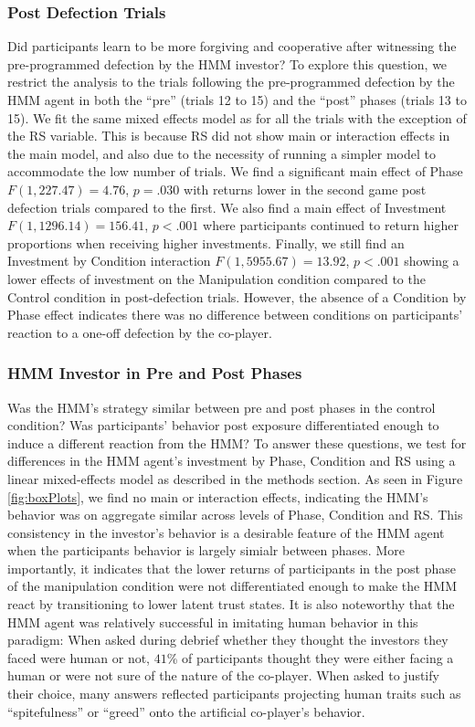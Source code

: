 \documentclass[
]{article}
\begin{document}
\subsubsection{Post Defection Trials}\label{post-defection-trials}

Did participants learn to be more forgiving and cooperative after witnessing the pre-programmed defection by the HMM investor? To explore this question, we restrict the analysis to the trials following the pre-programmed defection by the HMM agent in both the ``pre'' (trials 12 to 15) and the ``post'' phases (trials 13 to 15). We fit the same mixed effects model as for all the trials with the exception of the RS variable. This is because RS did not show main or interaction effects in the main model, and also due to the necessity of running a simpler model to accommodate the low number of trials. We find a significant main effect of Phase \(F(1, 227.47) = 4.76\), \(p = .030\) with returns lower in the second game post defection trials compared to the first. We also find a main effect of Investment
\(F(1, 1296.14) = 156.41\), \(p < .001\)
where participants continued to return higher proportions when receiving higher investments.
Finally, we still find an Investment by Condition interaction
\(F(1, 5955.67) = 13.92\), \(p < .001\) showing a lower effects of investment on the Manipulation condition compared to the Control condition in post-defection trials. However, the absence of a Condition by Phase effect indicates there was no difference between conditions on participants' reaction to a one-off defection by the co-player.

\subsubsection{HMM Investor in Pre and Post Phases}\label{hmm-investor-in-pre-and-post-phases}

Was the HMM's strategy similar between pre and post phases in the control condition? Was participants' behavior post exposure differentiated enough to induce a different reaction from the HMM? To answer these questions, we test for differences in the HMM agent's investment by Phase, Condition and RS using a linear mixed-effects model as described in the methods section. As seen in Figure \ref{fig:boxPlots}, we find no main or interaction effects, indicating the HMM's behavior was on aggregate similar across levels of Phase, Condition and RS. This consistency in the investor's behavior is a desirable feature of the HMM agent when the participants behavior is largely simialr between phases. More importantly, it indicates that the lower returns of participants in the post phase of the manipulation condition were not differentiated enough to make the HMM react by transitioning to lower latent trust states. It is also noteworthy that the HMM agent was relatively successful in imitating human behavior in this paradigm: When asked during debrief whether they thought the investors they faced were human or not, \(41\)\% of participants thought they were either facing a human or were not sure of the nature of the co-player. When asked to justify their choice, many answers reflected participants projecting human traits such as ``spitefulness'' or ``greed'' onto the artificial co-player's behavior.
\end{document}
